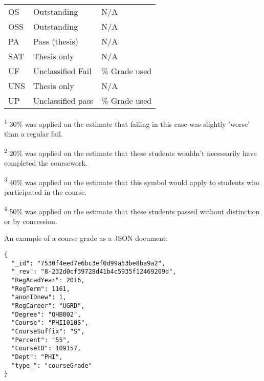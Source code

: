 \begin{table}[H]
\begin{threeparttable}
\begin{tabularx}{\textwidth}{>{\hsize=0.6\hsize}X>{\hsize=1.3\hsize}X>{\hsize=1.1\hsize}X}
            OS             & Outstanding              & N/A                                        \\
            OSS            & Outstanding              & N/A                                        \\
            PA             & Pass (thesis)            & N/A                                        \\
            SAT            & Thesis only              & N/A                                        \\
            UF             & Unclassified Fail        & 30\% Grade used\tnote{\textsuperscript{1}} \\
            UNS            & Thesis only              & N/A                                        \\
            UP             & Unclassified pass        & 50\% Grade used\tnote{\textsuperscript{4}} \\
            \bottomrule
        \end{tabularx}
        \scriptsize
        \begin{tablenotes}
            \item[\textsuperscript{1}]30\% was applied on the estimate that failing in this case was slightly 'worse' than a regular fail.
            \item[\textsuperscript{2}]20\% was applied on the estimate that these students wouldn't necessarily have completed the coursework.
            \item[\textsuperscript{3}]40\% was applied on the estimate that this symbol would apply to students who participated in the course.
            \item[\textsuperscript{4}]50\% was applied on the estimate that these students passed without distinction or by concession.
        \end{tablenotes}
    \end{threeparttable}
\end{table}





An example of a course grade as a JSON document:

\begin{verbatim}
{
  "_id": "7530f4eed7e6bc3ef0d99a53be8ba9a2",
  "_rev": "8-232d0cf39728d41b4c5935f12469209d",
  "RegAcadYear": 2016,
  "RegTerm": 1161,
  "anonIDnew": 1,
  "RegCareer": "UGRD",
  "Degree": "QHB002",
  "Course": "PHI1010S",
  "CourseSuffix": "S",
  "Percent": "55",
  "CourseID": 109157,
  "Dept": "PHI",
  "type_": "courseGrade"
}
\end{verbatim}


